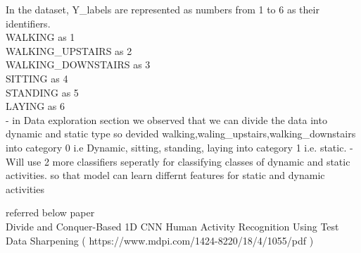 \documentclass[11pt]{article}
\begin{document}
    In the dataset, Y\_labels are represented as numbers from 1 to 6 as
their identifiers.\\
WALKING as 1\\
WALKING\_UPSTAIRS as 2\\
WALKING\_DOWNSTAIRS as 3\\
SITTING as 4\\
STANDING as 5\\
LAYING as 6\\
- in Data exploration section we observed that we can divide the data
into dynamic and static type so devided
walking,waling\_upstairs,walking\_downstairs into category 0 i.e
Dynamic, sitting, standing, laying into category 1 i.e. static. - Will
use 2 more classifiers seperatly for classifying classes of dynamic and
static activities. so that model can learn differnt features for static
and dynamic activities

referred below paper\\
Divide and Conquer-Based 1D CNN Human Activity Recognition Using Test
Data Sharpening ( https://www.mdpi.com/1424-8220/18/4/1055/pdf )
\end{document}
